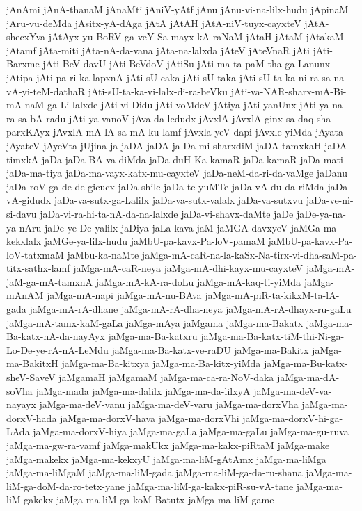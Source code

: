 {jAnAmi
jAnA-thanaM
jAnaMti
jAniV-yAtf
jAnu
jAnu-vi-na-lilx-hudu
jApinaM
jAru-vu-deMda
jAsitx-yA-dAga
jAtA
jAtAH
jAtA-niV-tuyx-cayxteV
jAtA-shecxYva
jAtAyx-yu-BoRV-ga-veY-Sa-mayx-kA-raNaM
jAtaH
jAtaM
jAtakaM
jAtamf
jAta-miti
jAta-nA-da-vana
jAta-na-lalxda
jAteV
jAteVnaR
jAti
jAti-Barxme
jAti-BeV-davU
jAti-BeVdoV
jAtiSu
jAti-ma-ta-paM-tha-ga-Lanunx
jAtipa
jAti-pa-ri-ka-lapxnA
jAti-sU-caka
jAti-sU-taka
jAti-sU-ta-ka-ni-ra-sa-na-vA-yi-teM-dathaR
jAti-sU-ta-ka-vi-lalx-di-ra-beVku
jAti-va-NAR-sharx-mA-Bi-mA-naM-ga-Li-lalxde
jAti-vi-Didu
jAti-voMdeV
jAtiya
jAti-yanUnx
jAti-ya-na-ra-sa-bA-radu
jAti-ya-vanoV
jAva-da-ledudx
jAvxlA
jAvxlA-ginx-sa-daq-sha-parxKAyx
jAvxlA-mA-lA-sa-mA-ku-lamf
jAvxla-yeV-dapi
jAvxle-yiMda
jAyata
jAyateV
jAyeVta
jUjina
ja
jaDA
jaDA-ja-Da-mi-sharxdiM
jaDA-tamxkaH
jaDA-timxkA
jaDa
jaDa-BA-va-diMda
jaDa-duH-Ka-kamaR
jaDa-kamaR
jaDa-mati
jaDa-ma-tiya
jaDa-ma-vayx-katx-mu-cayxteV
jaDa-neM-da-ri-da-vaMge
jaDanu
jaDa-roV-ga-de-de-gicucx
jaDa-shile
jaDa-te-yuMTe
jaDa-vA-du-da-riMda
jaDa-vA-gidudx
jaDa-va-sutx-ga-Lalilx
jaDa-va-sutx-valalx
jaDa-va-sutxvu
jaDa-ve-ni-si-davu
jaDa-vi-ra-hi-ta-nA-da-na-lalxde
jaDa-vi-shavx-daMte
jaDe
jaDe-ya-na-ya-nAru
jaDe-ye-De-yalilx
jaDiya
jaLa-kava
jaM
jaMGA-davxyeV
jaMGa-ma-kekxlalx
jaMGe-ya-lilx-hudu
jaMbU-pa-kavx-Pa-loV-pamaM
jaMbU-pa-kavx-Pa-loV-tatxmaM
jaMbu-ka-naMte
jaMga-mA-caR-na-la-kaSx-Na-tirx-vi-dha-saM-pa-titx-sathx-lamf
jaMga-mA-caR-neya
jaMga-mA-dhi-kayx-mu-cayxteV
jaMga-mA-jaM-ga-mA-tamxnA
jaMga-mA-kA-ra-doLu
jaMga-mA-kaq-ti-yiMda
jaMga-mAnAM
jaMga-mA-napi
jaMga-mA-nu-BAva
jaMga-mA-piR-ta-kikxM-ta-lA-gada
jaMga-mA-rA-dhane
jaMga-mA-rA-dha-neya
jaMga-mA-rA-dhayx-ru-gaLu
jaMga-mA-tamx-kaM-gaLa
jaMga-mAya
jaMgama
jaMga-ma-Bakatx
jaMga-ma-Ba-katx-nA-da-nayAyx
jaMga-ma-Ba-katxru
jaMga-ma-Ba-katx-tiM-thi-Ni-ga-Lo-De-ye-rA-nA-LeMdu
jaMga-ma-Ba-katx-ve-raDU
jaMga-ma-Bakitx
jaMga-ma-BakitxH
jaMga-ma-Ba-kitxya
jaMga-ma-Ba-kitx-yiMda
jaMga-ma-Bu-katx-sheV-SaveV
jaMgamaH
jaMgamaM
jaMga-ma-ca-ra-NoV-daka
jaMga-ma-dA-soVha
jaMga-mada
jaMga-ma-dalilx
jaMga-ma-da-lilxyA
jaMga-ma-deV-va-nayayx
jaMga-ma-deV-vanu
jaMga-ma-deV-varu
jaMga-ma-dorxVha
jaMga-ma-dorxV-hada
jaMga-ma-dorxV-hava
jaMga-ma-dorxVhi
jaMga-ma-dorxV-hi-ga-LAda
jaMga-ma-dorxV-hiya
jaMga-ma-gaLa
jaMga-ma-gaLu
jaMga-ma-gu-ruva
jaMga-ma-gw-ra-vamf
jaMga-makUkx
jaMga-ma-kakx-piRtaM
jaMga-make
jaMga-makekx
jaMga-ma-kekxyU
jaMga-ma-liM-gAtAmx
jaMga-ma-liMga
jaMga-ma-liMgaM
jaMga-ma-liM-gada
jaMga-ma-liM-ga-da-ru-shana
jaMga-ma-liM-ga-doM-da-ro-tetx-yane
jaMga-ma-liM-ga-kakx-piR-su-vA-tane
jaMga-ma-liM-gakekx
jaMga-ma-liM-ga-koM-Batutx
jaMga-ma-liM-game
}
